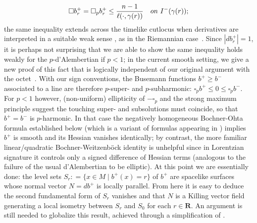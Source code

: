 \documentclass[12pt]{amsart}
\newcommand{\R}{{\mathbf R}}
\begin{document}
\begin{equation}\label{p-comparison}
\square b^+_r = \square_p b^+_r \le \frac{n-1}{\ell(\cdot,\gamma(r))} \quad {\rm on}\ I^-(\gamma(r));
\end{equation}
the same inequality extends across the timelike cutlocus when derivatives are interpreted in a suitable weak sense \cite{BeranOctet24+}, 
as in the Riemannian case~\cite{Calabi58v}.
Since $|db^+_r|=1$,  it is perhaps not surprising that we are able to show the same inequality holds weakly for the $p$-d'Alembertian if $p<1$;  in the current smooth setting, we give a new proof of this fact that is logically independent of our original argument with the 
octet~\cite{BeranOctet24+}.
With our sign conventions, the Busemann functions $b^+\ge b^-$ associated to a line are therefore $p$-super- and $p$-subharmonic:
$\square_p b^+ \le 0 \le \square_p b^-$. %
For $p<1$ however, (non-uniform) ellipticity of $-\square_p$ and the strong maximum principle suggest the touching super- and subsolutions
must coincide,  so that $b^+=b^-$ is $p$-harmonic. 
In that case the negatively homogeneous Bochner-Ohta formula established below (which 
{is a variant of formulas appearing in \cite{Ohta14h, MondinoSuhr23}})
implies $b^+$ is smooth and its Hessian vanishes identically; by contrast, the more familiar linear/quadratic Bochner-Weitzenb\"ock identity is unhelpful since in Lorentzian signature
it controls only a signed difference of Hessian terms (analogous to the failure of the usual d'Alembertian to be elliptic).
At this point we are essentially done:  the level sets $S_r: = \{x \in M \mid b^+(x)=r\}$ of $b^+$ are spacelike surfaces whose normal vector $N=d b^+$ is locally parallel.  From here it is easy to deduce the second fundamental form of $S_r$ vanishes and that $N$ is a Killing vector field generating a local isometry between $S_r$ and $S_0$ for each $r \in \R$.  An argument is still needed to globalize this result, achieved through a simplification of \cite{Eschenburg88,Galloway89,Newman90}.

 
\end{document}
